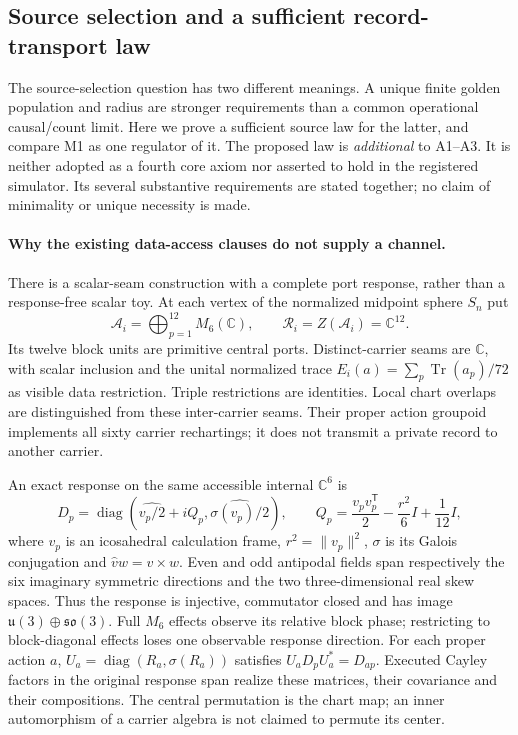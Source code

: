 \subsection{Source selection and a sufficient record-transport law}
\label{sec:source-record-gluing}

The source-selection question has two different meanings. A unique finite
golden population and radius are stronger requirements than a common
operational causal/count limit. Here we prove a sufficient source law for
the latter, and compare M1 as one regulator of it. The proposed law is
\emph{additional} to A1--A3. It is neither adopted as a fourth core axiom
nor asserted to hold in the registered simulator. Its several substantive
requirements are stated together; no claim of minimality or unique
necessity is made.

\paragraph{Why the existing data-access clauses do not supply a channel.}
There is a scalar-seam construction with a complete port response, rather
than a response-free scalar toy. At each vertex of the normalized midpoint
sphere $S_n$ put
\[
 \mathcal A_i=\bigoplus_{p=1}^{12}M_6(\mathbb C),\qquad
 \mathcal R_i=Z(\mathcal A_i)=\mathbb C^{12}.
\]
Its twelve block units are primitive central ports. Distinct-carrier seams
are $\mathbb C$, with scalar inclusion and the unital normalized trace
$E_i(a)=\sum_p\operatorname{Tr}(a_p)/72$ as visible data restriction.
Triple restrictions are identities. Local chart overlaps are distinguished
from these inter-carrier seams. Their proper action groupoid implements
all sixty carrier rechartings; it does not transmit a private record to
another carrier.

An exact response on the same accessible internal $\mathbb C^6$ is
\[
 D_p=\operatorname{diag}\!\left(
 \widehat{v_p/2}+iQ_p,\widehat{\sigma(v_p)/2}\right),\qquad
 Q_p=\frac{v_pv_p^{\mathsf T}}2-\frac{r^2}6 I+\frac1{12}I,
\]
where $v_p$ is an icosahedral calculation frame, $r^2=\|v_p\|^2$,
$\sigma$ is its Galois conjugation and $\widehat v w=v\times w$.
Even and odd antipodal fields span respectively the six imaginary symmetric
directions and the two three-dimensional real skew spaces. Thus the
response is injective, commutator closed and has image
$\mathfrak u(3)\oplus\mathfrak{so}(3)$. Full $M_6$ effects observe its
relative block phase; restricting to block-diagonal effects loses one
observable response direction. For each proper action $a$,
$U_a=\operatorname{diag}(R_a,\sigma(R_a))$ satisfies
$U_aD_pU_a^*=D_{ap}$. Executed Cayley factors in the original response span
realize these matrices, their covariance and their compositions.
The central permutation is the chart map; an inner automorphism of a
carrier algebra is not claimed to permute its center.

